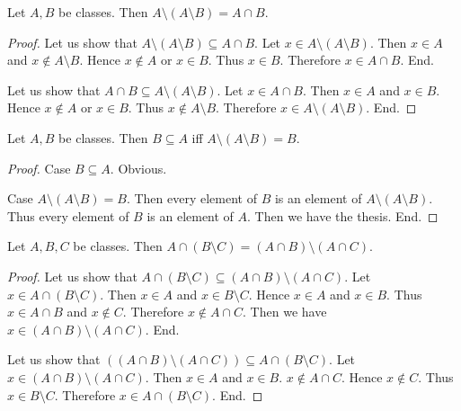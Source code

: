 \documentclass[10pt]{article}
\begin{document}
  \begin{forthel}
    \begin{proposition}[id=FOUNDATIONS_02_7083929257377792,printid]
      Let $A, B$ be classes.
      Then $A \setminus (A \setminus B) = A \cap B$.
    \end{proposition}
    \begin{proof}
      Let us show that $A \setminus (A \setminus B) \subseteq A \cap B$.
        Let $x \in A \setminus (A \setminus B)$.
        Then $x \in A$ and $x \notin A \setminus B$.
        Hence $x \notin A$ or $x \in B$.
        Thus $x \in B$.
        Therefore $x \in A \cap B$.
      End.

      Let us show that $A \cap B \subseteq A \setminus (A \setminus B)$.
        Let $x \in A \cap B$.
        Then $x \in A$ and $x \in B$.
        Hence $x \notin A$ or $x \in B$.
        Thus $x \notin A \setminus B$.
        Therefore $x \in A \setminus (A \setminus B)$.
      End.
    \end{proof}
  \end{forthel}

  \begin{forthel}
    \begin{proposition}[id=FOUNDATIONS_02_4938646769631232,printid]
      Let $A, B$ be classes.
      Then $B \subseteq A$ iff $A \setminus (A \setminus B) = B$.
    \end{proposition}
    \begin{proof}
      Case $B \subseteq A$. Obvious.

      Case $A \setminus (A \setminus B) = B$.
        Then every element of $B$ is an element of $A \setminus (A \setminus B)$.
        Thus every element of $B$ is an element of $A$.
        Then we have the thesis.
      End.
    \end{proof}
  \end{forthel}

  \begin{forthel}
    \begin{proposition}[id=FOUNDATIONS_02_5811954316738560,printid]
      Let $A, B, C$ be classes.
      Then $A \cap (B \setminus C) = (A \cap B) \setminus (A \cap C)$.
    \end{proposition}
    \begin{proof}
      Let us show that $A \cap (B \setminus C) \subseteq (A \cap B) \setminus (A \cap C)$.
        Let $x \in A \cap (B \setminus C)$.
        Then $x \in A$ and $x \in B \setminus C$.
        Hence $x \in A$ and $x \in B$.
        Thus $x \in A \cap B$ and $x \notin C$.
        Therefore $x \notin A \cap C$.
        Then we have $x \in (A \cap B) \setminus (A \cap C)$.
      End.

      Let us show that $((A \cap B) \setminus (A \cap C)) \subseteq A \cap (B \setminus C)$. %
        Let $x \in (A \cap B) \setminus (A \cap C)$.
        Then $x \in A$ and $x \in B$.
        $x \notin A \cap C$.
        Hence $x \notin C$.
        Thus $x \in B \setminus C$.
        Therefore $x \in A \cap (B \setminus C)$.
      End.
    \end{proof}
  \end{forthel}
\end{document}
